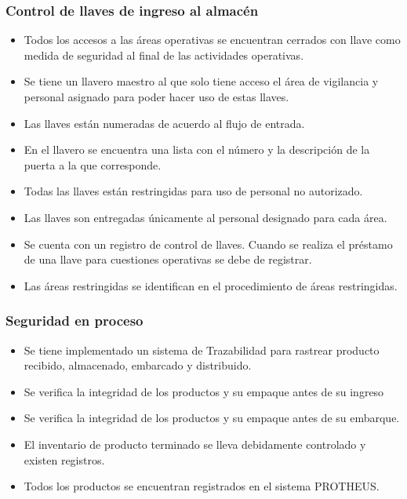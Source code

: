 \subsubsection{Control de llaves de ingreso al almacén}
\begin{itemize}
	\item Todos los accesos a las áreas operativas se encuentran cerrados con llave como medida de seguridad al final de las actividades operativas.
	\item Se tiene un llavero maestro al que solo tiene acceso el área de vigilancia y personal asignado para poder hacer uso de estas llaves.
	\item Las llaves están numeradas de acuerdo al flujo de entrada.
	\item En el llavero se encuentra una lista con el número y la descripción de la puerta a la que corresponde.
	\item Todas las llaves están restringidas para uso de personal no autorizado.
	\item Las llaves son entregadas únicamente al personal designado para cada área.
	\item Se cuenta con un registro de control de llaves. Cuando se realiza el préstamo de una llave para cuestiones operativas se debe de registrar.
	\item Las áreas restringidas se identifican en el procedimiento de áreas restringidas.
\end{itemize}

\subsubsection{Seguridad en proceso}
\begin{itemize}
	\item Se tiene implementado un sistema de Trazabilidad para rastrear producto recibido, almacenado, embarcado y distribuido.
	\item Se verifica la integridad de los productos y su empaque antes de su ingreso
	\item Se verifica la integridad de los productos y su empaque antes de su embarque.
	\item El inventario de producto terminado se lleva debidamente controlado y existen registros.
	\item Todos los productos se encuentran registrados en el sistema PROTHEUS.
\end{itemize}

